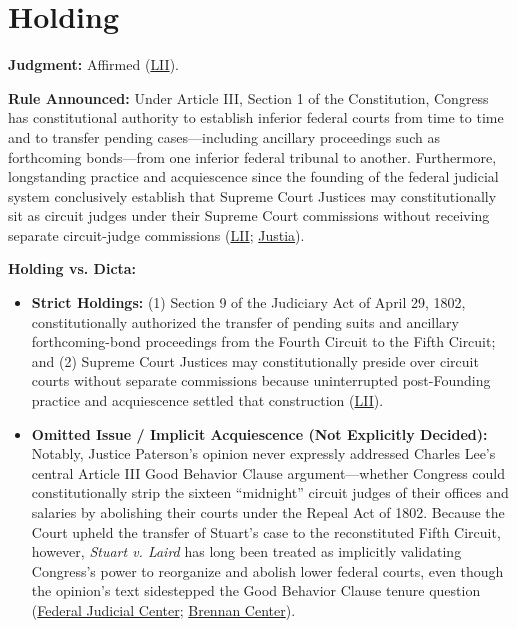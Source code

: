 \documentclass[12pt]{article}
\begin{document}
\section{Holding}

\textbf{Judgment:} Affirmed (\href{https://www.law.cornell.edu/supremecourt/text/5/299}{LII}).

\textbf{Rule Announced:} Under Article III, Section 1 of the Constitution, Congress has constitutional authority to establish inferior federal courts from time to time and to transfer pending cases---including ancillary proceedings such as forthcoming bonds---from one inferior federal tribunal to another. Furthermore, longstanding practice and acquiescence since the founding of the federal judicial system conclusively establish that Supreme Court Justices may constitutionally sit as circuit judges under their Supreme Court commissions without receiving separate circuit-judge commissions (\href{https://www.law.cornell.edu/supremecourt/text/5/299}{LII}; \href{https://supreme.justia.com/cases/federal/us/5/299/}{Justia}).

\textbf{Holding vs. Dicta:}
\begin{itemize}
\item \textbf{Strict Holdings:} (1) Section 9 of the Judiciary Act of April 29, 1802, constitutionally authorized the transfer of pending suits and ancillary forthcoming-bond proceedings from the Fourth Circuit to the Fifth Circuit; and (2) Supreme Court Justices may constitutionally preside over circuit courts without separate commissions because uninterrupted post-Founding practice and acquiescence settled that construction (\href{https://www.law.cornell.edu/supremecourt/text/5/299}{LII}).
\item \textbf{Omitted Issue / Implicit Acquiescence (Not Explicitly Decided):} Notably, Justice Paterson's opinion never expressly addressed Charles Lee's central Article III Good Behavior Clause argument---whether Congress could constitutionally strip the sixteen ``midnight'' circuit judges of their offices and salaries by abolishing their courts under the Repeal Act of 1802. Because the Court upheld the transfer of Stuart's case to the reconstituted Fifth Circuit, however, \textit{Stuart v. Laird} has long been treated as implicitly validating Congress's power to reorganize and abolish lower federal courts, even though the opinion's text sidestepped the Good Behavior Clause tenure question (\href{https://www.fjc.gov/history/exhibits/judiciary-act-1801}{Federal Judicial Center}; \href{https://www.brennancenter.org/media/15940/download/bcj_constitutionality-of-supreme-court-term-limits.pdf?inline=1}{Brennan Center}).
\end{itemize}
\end{document}
